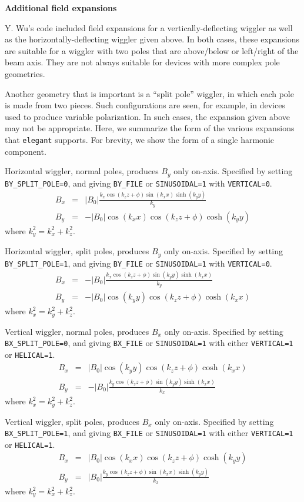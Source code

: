 {\bf Additional field expansions}

Y. Wu's code included field expansions for a vertically-deflecting
wiggler as well as the horizontally-deflecting wiggler given above.
In both cases, these expansions are suitable for a wiggler with two
poles that are above/below or left/right of the beam axis.  They are
not always suitable for devices with more complex pole geometries.

Another geometry that is important is a ``split pole'' wiggler, in which
each pole is made from two pieces.  Such configurations are seen, for example,
in devices used to produce variable polarization.  In such cases, the
expansion given above may not be appropriate.  Here, we summarize the form of the
various expansions that {\tt elegant} supports.  For brevity, we show the
form of a single harmonic component.

Horizontal wiggler, normal poles, produces $B_y$ only on-axis.   Specified
by setting {\tt BY\_SPLIT\_POLE=0}, and giving {\tt BY\_FILE} or {\tt SINUSOIDAL=1} with {\tt VERTICAL=0}.
\begin{eqnarray}
B_x & = & \left|B_0\right| \frac{k_x \cos (k_z z + \phi) \sin (k_x x) \sinh (k_y y)}{k_y}\\
B_y & = & - \left|B_0\right| \cos (k_x x) \cos (k_z z + \phi) \cosh (k_y y)
\end{eqnarray}
where $k_y^2 = k_x^2 + k_z^2$.

Horizontal wiggler, split poles, produces $B_y$ only on-axis.   Specified
by setting {\tt BY\_SPLIT\_POLE=1}, and giving {\tt BY\_FILE} or {\tt SINUSOIDAL=1} with {\tt VERTICAL=0}.
\begin{eqnarray}
B_x & = & -\left|B_0\right| \frac{k_x \cos (k_z z + \phi) \sin (k_y y) \sinh (k_x x)}{k_y}\\
B_y & = & -\left|B_0\right| \cos (k_y y) \cos (k_z z + \phi) \cosh (k_x x)
\end{eqnarray}
where $k_x^2 = k_y^2 + k_z^2$.

Vertical wiggler, normal poles, produces $B_x$ only on-axis.   Specified
by setting {\tt BX\_SPLIT\_POLE=0}, and giving {\tt BX\_FILE} or {\tt SINUSOIDAL=1} with either {\tt VERTICAL=1} or
{\tt HELICAL=1}.
\begin{eqnarray}
B_x & = & \left|B_0\right| \cos (k_y y) \cos (k_z z + \phi) \cosh (k_x x)\\
B_y & = & -\left|B_0\right| \frac{k_y \cos (k_z z + \phi) \sin (k_y y) \sinh (k_x x)}{k_x}
\end{eqnarray}
where $k_x^2 = k_y^2 + k_z^2$.

Vertical wiggler, split poles, produces $B_x$ only on-axis.   Specified
by setting {\tt BX\_SPLIT\_POLE=1}, and giving {\tt BX\_FILE} or {\tt SINUSOIDAL=1} with either {\tt VERTICAL=1} or
{\tt HELICAL=1}.
\begin{eqnarray}
B_x & = & \left|B_0\right| \cos (k_x x) \cos (k_z z + \phi) \cosh (k_y y)\\
B_y & = & \left|B_0\right| \frac{k_y \cos (k_z z + \phi) \sin (k_x x) \sinh (k_y y)}{k_x}
\end{eqnarray}
where $k_y^2 = k_x^2 + k_z^2$.
